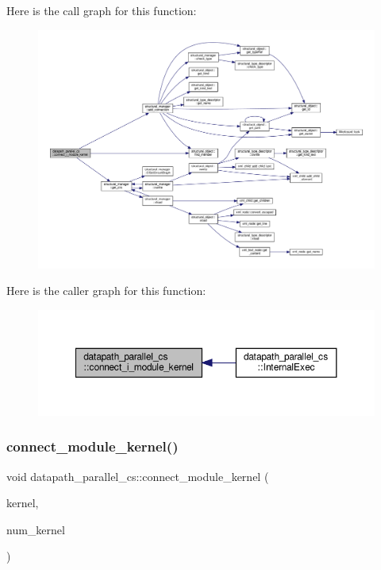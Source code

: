 Here is the call graph for this function\+:
\nopagebreak
\begin{figure}[H]
\begin{center}
\leavevmode
\includegraphics[width=350pt]{d7/d60/classdatapath__parallel__cs_a13170eb5321f0a469bad1b7db4c1cd9a_cgraph}
\end{center}
\end{figure}
Here is the caller graph for this function\+:
\nopagebreak
\begin{figure}[H]
\begin{center}
\leavevmode
\includegraphics[width=350pt]{d7/d60/classdatapath__parallel__cs_a13170eb5321f0a469bad1b7db4c1cd9a_icgraph}
\end{center}
\end{figure}
\mbox{\label{classdatapath__parallel__cs_a641a653a7ee22f066b3c6f592af2669f}} 
\subsubsection{\texorpdfstring{connect\+\_\+module\+\_\+kernel()}{connect\_module\_kernel()}}
{\footnotesize\ttfamily void datapath\+\_\+parallel\+\_\+cs\+::connect\+\_\+module\+\_\+kernel (\begin{DoxyParamCaption}\item[{\hyperlink{structural__objects_8hpp_a8ea5f8cc50ab8f4c31e2751074ff60b2}{structural\+\_\+object\+Ref}}]{kernel,  }\item[{unsigned int}]{num\+\_\+kernel }\end{DoxyParamCaption})\hspace{0.3cm}{\ttfamily [protected]}}



